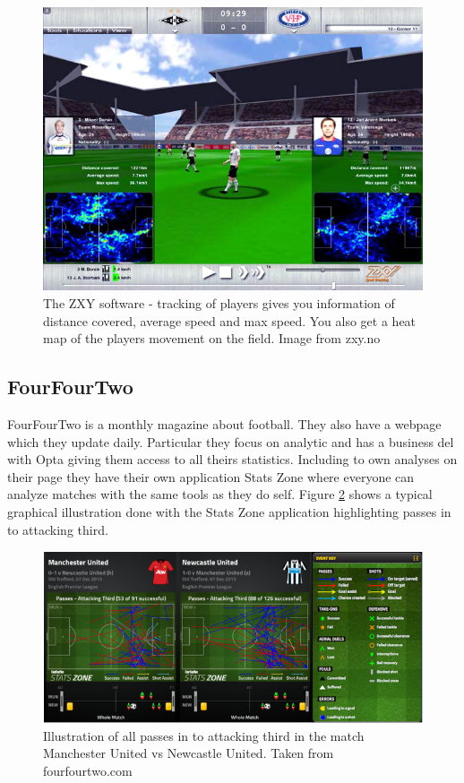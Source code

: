 \begin{figure}[ht!]
\centering
\includegraphics[width=1\textwidth]{images/general/zxysoftware.png}
\caption{The ZXY software - tracking of players gives you information of distance covered, average speed and max speed. You also get a heat map of the players movement on the field. Image from zxy.no}
\label{fig:zxysoftware}
\end{figure}


\subsection{FourFourTwo}

FourFourTwo is a monthly magazine about football. They also have a webpage which they update daily. Particular they focus on analytic and has a business del with Opta giving them access to all theirs statistics. Including to own analyses on their page they have their own application Stats Zone where everyone can analyze matches with the same tools as they do self. Figure \ref{fig:fourfourtwo} shows a typical
graphical illustration done with the Stats Zone application highlighting passes in to attacking third. 

\begin{figure}[ht!]
\centering
\includegraphics[width=1\textwidth]{images/general/fourfourtwo.png}
\caption{Illustration of all passes in to attacking third in the match Manchester United vs Newcastle United. Taken from fourfourtwo.com}
\label{fig:fourfourtwo}
\end{figure}
